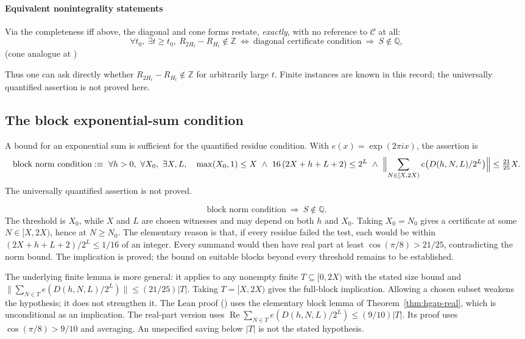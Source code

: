 \paragraph{Equivalent nonintegrality statements}
Via the completeness iff above, the diagonal and cone forms restate,
\emph{exactly}, with no reference to $\mathcal{C}$ at all:
\[
  \forall t_0,\ \exists t\ge t_0,\ R_{2H_t}-R_{H_t}\notin\mathbb{Z}
  \ \Longleftrightarrow\ \text{diagonal certificate condition}
  \ \Longrightarrow\ S\notin\mathbb Q,
\]
(cone analogue at
)

Thus one can ask directly whether $R_{2H_t}-R_{H_t}\notin\mathbb Z$
for arbitrarily large $t$. Finite instances are known in this record;
the universally quantified assertion is not proved here.

\subsection{The block exponential-sum condition}


A bound for an exponential sum is sufficient for the quantified
residue condition. With $e(x)=\exp(2\pi i x)$, the assertion is
\[
  \text{block norm condition} :\equiv\
  \forall h>0,\ \forall X_0,\ \exists X,L,\quad
  \max(X_0,1)\le X\ \wedge\
  16\,(2X+h+L+2)\le 2^L\ \wedge\
  \Bigl\|\sum_{N\in[X,2X)} e\bigl(D(h,N,L)/2^L\bigr)\Bigr\| \le \tfrac{21}{25}X.
\]
The universally quantified assertion is not proved.

\[
  \text{block norm condition} \ \Longrightarrow\ S\notin\mathbb Q.
\]
The threshold is $X_0$, while $X$ and $L$ are chosen witnesses and may
depend on both $h$ and $X_0$. Taking $X_0=N_0$ gives a certificate
at some $N\in[X,2X)$, hence at $N\ge N_0$. The elementary reason is
that, if every residue failed the test, each would be within
$(2X+h+L+2)/2^L\le1/16$ of an integer. Every summand would then have
real part at least $\cos(\pi/8)>21/25$, contradicting the norm bound.
The implication is proved; the bound on suitable blocks beyond every
threshold remains to be established.

The underlying finite lemma is more general: it applies to any nonempty
finite $T\subseteq[0,2X)$ with the stated size bound and
$\|\sum_{N\in T}e(D(h,N,L)/2^L)\|\le(21/25)|T|$.
Taking $T=[X,2X)$ gives the full-block implication. Allowing a chosen
subset weakens the hypothesis; it does not strengthen it. The Lean proof
()
uses the elementary block lemma of Theorem~\ref{thm:hgap-real}, which is
unconditional as an implication. The real-part version uses
$\operatorname{Re}\sum_{N\in T}e(D(h,N,L)/2^L)\le(9/10)|T|$.
Its proof uses $\cos(\pi/8)>9/10$ and averaging. An unspecified saving
below $|T|$ is not the stated hypothesis.

